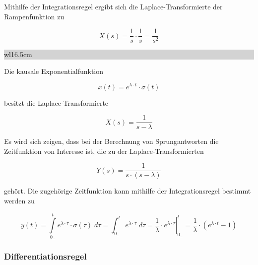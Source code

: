 \noindent Mithilfe der Integrationsregel ergibt sich die Laplace-Transformierte der Rampenfunktion zu\bigskip

\begin{equation}\label{eq:foursixtythree}
X\left(s\right)=\frac{1}{s} \cdot \frac{1}{s} =\frac{1}{s^{2} }
\end{equation}

\noindent
\colorbox{lightgray}{%
%
\renewcommand\arraystretch{0.6}%
\begin{tabular}{ wl{16.5cm} }
{\selectfont{Beispiel: Integrationsregel der Laplace-Transformation}}
\end{tabular}%
}\bigskip

\noindent Die kausale Exponentialfunktion

\begin{equation}\label{eq:foursixtyfour}
x\left(t\right)=e^{\lambda \cdot t} \cdot \sigma \left(t\right)
\end{equation}

\noindent besitzt die Laplace-Transformierte 

\begin{equation}\label{eq:foursixtyfive}
X\left(s\right)=\frac{1}{s-\lambda }
\end{equation}

\noindent Es wird sich zeigen, dass bei der Berechnung von Sprungantworten die Zeitfunktion von Interesse ist, die zu der Laplace-Transformierten

\begin{equation}\label{eq:foursixtysix}
Y\left(s\right)=\frac{1}{s\cdot \left(s-\lambda \right)}
\end{equation}

\noindent gehört. Die zugehörige Zeitfunktion kann mithilfe der Integrationsregel bestimmt werden zu

\begin{equation}\label{eq:foursixtyseven}
y\left(t\right)=\int\limits _{0_{-} }^{t}e^{\lambda \cdot \tau } \cdot \sigma \left(\tau \right) \; d\tau =\int _{0_{-} }^{t}e^{\lambda \cdot \tau }  \; d\tau =\left. \frac{1}{\lambda } \cdot e^{\lambda \cdot \tau } \right|_{0_{-} }^{t} =\frac{1}{\lambda } \cdot \left(e^{\lambda \cdot t} -1\right)
\end{equation}

\subsubsection{Differentiationsregel}\label{fourtwoseven}

